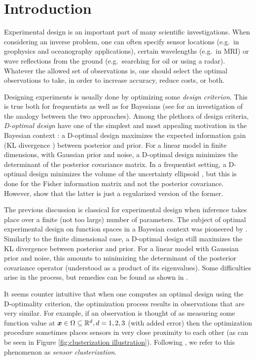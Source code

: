 \section{Introduction}\label{section:OED intro}
Experimental design is an important part of many scientific
investigations. When considering an inverse problem, one can often
specify sensor locations (e.g.\ in geophysics and oceanography
applications), certain wavelengths (e.g.\ in MRI) or wave reflections
from the ground (e.g.\ searching for oil or using a radar). Whatever
the allowed set of observations is, one should select the optimal
observations to take, in order to increase accuracy, reduce costs, or
both.

Designing experiments is usually done by optimizing some \emph{design
criterion}. This is true both for frequentists
\cite{silvey2013,Ucinski05} as well as for Bayesians
\cite{Chaloner1995} (see \cite{Chaloner1995} for an investigation of
the analogy between the two approaches). Among the plethora of design
criteria, \emph{D-optimal design} have one of the simplest and most
appealing motivation in the Bayesian context \cite{Chaloner1995}: a
D-optimal design maximizes the expected information gain (KL
divergence \cite{CoverThomas91}) between posterior and prior. For a
linear model in finite dimensions, with Gaussian prior and noise, a
D-optimal design minimizes the determinant of the posterior covariance
matrix. In a frequentist setting, a D-optimal design minimizes the
volume of the uncertainty ellipsoid \cite[page 16]{Ucinski05}, but
this is done for the Fisher information matrix and not the posterior
covariance. However, \cite{Chaloner1995} show that the latter is just
a regularized version of the former.

The previous discussion is classical for experimental design when
inference takes place over a finite (not too large) number of
parameters. The subject of optimal experimental design on function
spaces in a Bayesian context was pioneered by
\cite{AlexanderianGloorGhattas14, AlexanderianPetraStadlerEtAl16,
  AlexanderianPetraStadlerEtAl14}. Similarly to the finite dimensional
case, a D-optimal design still maximizes the KL divergence between
posterior and prior. For a linear model with Gaussian prior and noise,
this amounts to minimizing the determinant of the posterior covariance
operator (understood as a product of its eigenvalues). Some
difficulties arise in the process, but remedies can be found as shown
in \cite{AlexanderianGloorGhattas14}.

It seems counter intuitive that when one computes an optimal design
using the D-optimality criterion, the optimization process results in
observations that are very similar. For example, if an observation is
thought of as measuring some function value at ${\boldsymbol{x}} \in \Omega
\subseteq \mathbb{R}^d, d=1,2,3$ (with added error) then the optimization
procedure sometimes places sensors in very close proximity to each
other (as can be seen in Figure \ref{fig:clusterization
  illustration}). Following \cite{Ucinski05}, we refer to this
phenomenon as \emph{sensor clusterization}.

